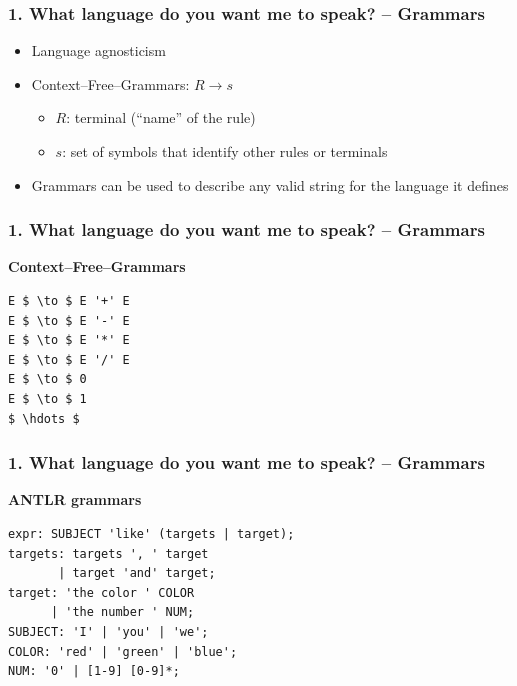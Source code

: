 \documentclass[t,aspectratio=32]{beamer}
\begin{document}

\begin{frame}
\frametitle{1. What language do you want me to speak? – Grammars}

\begin{itemize}
\item Language agnosticism
\item Context–Free–Grammars: $ R \to s $
    \begin{itemize}
    \item $ R $: terminal (``name'' of the rule)
    \item $ s $: set of symbols that identify other rules or terminals
    \end{itemize}
\item Grammars can be used to describe any valid string for the language
      it defines
\end{itemize}
\end{frame}

\begin{frame}[fragile]
\frametitle{1. What language do you want me to speak? – Grammars}

\textbf{Context–Free–Grammars}

\begin{lstlisting}[style=antlr]
E $ \to $ E '+' E
E $ \to $ E '-' E
E $ \to $ E '*' E
E $ \to $ E '/' E
E $ \to $ 0
E $ \to $ 1
$ \hdots $
\end{lstlisting}
\end{frame}

\begin{frame}[fragile]
\frametitle{1. What language do you want me to speak? – Grammars}

\textbf{ANTLR grammars}

\begin{lstlisting}[style=antlr]
expr: SUBJECT 'like' (targets | target);
targets: targets ', ' target
       | target 'and' target;
target: 'the color ' COLOR
      | 'the number ' NUM;
SUBJECT: 'I' | 'you' | 'we';
COLOR: 'red' | 'green' | 'blue';
NUM: '0' | [1-9] [0-9]*;
\end{lstlisting}
\end{frame}
\end{document}
